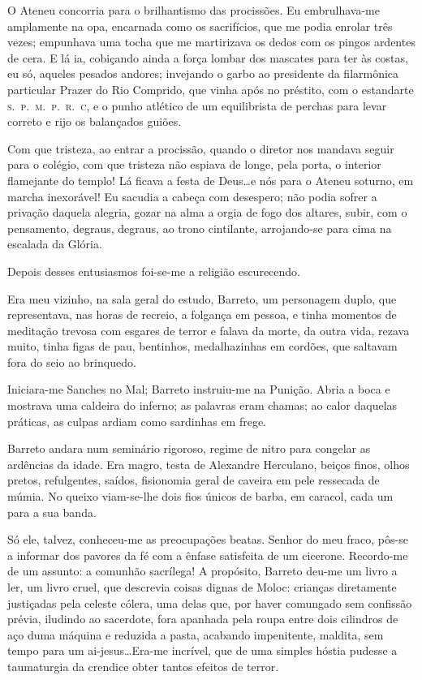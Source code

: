 O Ateneu concorria para o
brilhantismo das procissões. Eu embrulhava{}-me amplamente na opa,
encarnada como os sacrifícios, que me podia enrolar três vezes;
empunhava uma tocha que me martirizava os dedos com os pingos ardentes
de cera. E lá ia, cobiçando ainda a força lombar dos mascates para ter
às costas, eu só, aqueles pesados andores; invejando o garbo ao
presidente da filarmônica particular Prazer do Rio Comprido, que vinha
após no préstito, com o estandarte \textsc{s.~p.~m.~p.~r.~c}, e o punho atlético de
um equilibrista de perchas para levar correto e rijo os balançados
guiões. 

Com que tristeza, ao entrar a procissão, quando o diretor nos
mandava seguir para o colégio, com que tristeza não espiava de longe,
pela porta, o interior flamejante do templo! Lá ficava a festa de
Deus\ldots e nós para o Ateneu soturno, em marcha inexorável! Eu sacudia a
cabeça com desespero; não podia sofrer a privação daquela alegria,
gozar na alma a orgia de fogo dos altares, subir, com o pensamento,
degraus, degraus, ao trono cintilante, arrojando{}-se para cima na
escalada da Glória. 

Depois desses entusiasmos foi{}-se{}-me a religião escurecendo.

Era meu vizinho, na sala geral do estudo, Barreto, um personagem duplo,
que representava, nas horas de recreio, a folgança em pessoa, e tinha
momentos de meditação trevosa com esgares de terror e falava da morte,
da outra vida, rezava muito, tinha figas de pau, bentinhos,
medalhazinhas em cordões, que saltavam fora do seio ao brinquedo.

Iniciara{}-me Sanches no Mal; Barreto instruiu{}-me na Punição. Abria a
boca e mostrava uma caldeira do inferno; as palavras eram chamas; ao
calor daquelas práticas, as culpas ardiam como sardinhas em frege.

Barreto andara num seminário rigoroso, regime de nitro para congelar as
ardências da idade. Era magro, testa de Alexandre Herculano, beiços
finos, olhos pretos, refulgentes, saídos, fisionomia geral de caveira
em pele ressecada de múmia. No queixo viam{}-se{}-lhe dois fios únicos
de barba, em caracol, cada um para a sua banda. 

Só ele, talvez,
conheceu{}-me as preocupações beatas. Senhor do meu fraco, pôs{}-se a
informar dos pavores da fé com a ênfase satisfeita de um cicerone.
Recordo{}-me de um assunto: a comunhão sacrílega! A propósito, Barreto
deu{}-me um livro a ler, um livro cruel, que descrevia coisas dignas de
Moloc: crianças diretamente justiçadas pela celeste cólera, uma delas
que, por haver comungado sem confissão prévia, iludindo ao sacerdote,
fora apanhada pela roupa entre dois cilindros de aço duma máquina e
reduzida a pasta, acabando impenitente, maldita, sem tempo para um
ai{}-jesus\ldots Era{}-me incrível, que de uma simples hóstia pudesse a
taumaturgia da crendice obter tantos efeitos de terror. 

